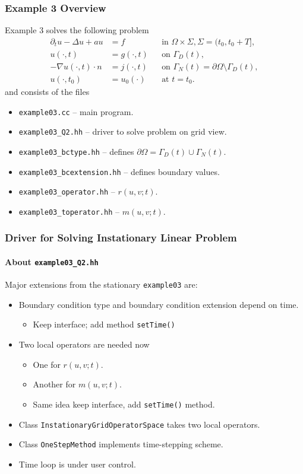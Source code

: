 \begin{frame}
\frametitle{Example 3 Overview}
Example 3 solves the following problem
\begin{subequations} 
\begin{align*}
\partial_t u -\Delta u + a u &= f &&\text{in $\Omega\times\Sigma$}, \Sigma=(t_0,t_0+T],\\
u(\cdot,t) &= g(\cdot,t) && \text{on $\Gamma_D(t)$},\\ 
-\nabla u(\cdot,t) \cdot n &= j(\cdot,t) &&\text{on $\Gamma_N(t)=\partial\Omega\setminus\Gamma_D(t)$},\\
u(\cdot,t_0) &= u_0(\cdot) && \text{at $t=t_0$}.
\end{align*}
\end{subequations}
and consists of the files
\begin{itemize}
\item \lstinline{example03.cc} -- main program.
\item \lstinline{example03_Q2.hh} -- driver to solve problem on grid view.
\item \lstinline{example03_bctype.hh} -- defines $\partial\Omega = \Gamma_D(t) \cup \Gamma_N(t)$.
\item \lstinline{example03_bcextension.hh} -- defines boundary values.
\item \lstinline{example03_operator.hh} -- $r(u,v;t)$.
\item \lstinline{example03_toperator.hh} -- $m(u,v;t)$.
\end{itemize}
\end{frame}

\begin{frame}
\frametitle{Driver for Solving Instationary Linear Problem}
\framesubtitle{About \lstinline{example03_Q2.hh}}
Major extensions from the stationary \lstinline{example03} are:
\begin{itemize}
\item Boundary condition type and boundary condition extension depend on time.
\begin{itemize}
\item Keep interface; add method \lstinline{setTime()}
\end{itemize}
\item Two local operators are needed now
\begin{itemize}
\item One for $r(u,v;t)$.
\item Another for $m(u,v;t)$.
\item Same idea keep interface, add \lstinline{setTime()} method.
\end{itemize}
\item Class \lstinline{InstationaryGridOperatorSpace} takes two local operators.
\item Class \lstinline{OneStepMethod} implements time-stepping scheme.
\item Time loop is under user control.
\end{itemize}
\end{frame}

